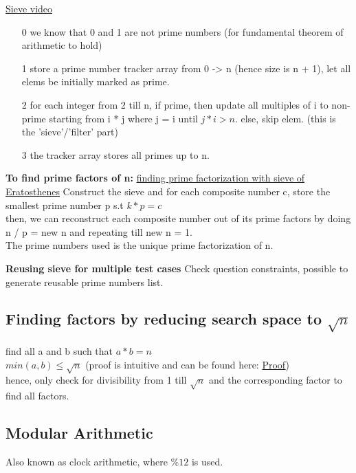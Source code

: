 \documentclass[12pt]{article}
\begin{document}
\href{https://www.khanacademy.org/computing/computer-science/cryptography/comp-number-theory/v/sieve-of-eratosthenes-prime-adventure-part-4}{Sieve video}
\begin{itemize} 
	\item[0] we know that 0 and 1 are not prime numbers (for fundamental theorem of arithmetic to hold) 
	\item[1] store a prime number tracker array from 0 -> n (hence size is n + 1), let all elems be initially marked as prime.  
	\item[2] for each integer from 2 till n, if prime, then update all multiples of i to non-prime starting from i * j where j = i until {\emph{\(j * i > n\)}}. else, skip elem. (this is the 'sieve'/'filter' part) 
	\item[3] the tracker array stores all primes up to n. 
\end{itemize} 

{\textbf{To find prime factors of n:}}
\href{https://www.geeksforgeeks.org/prime-factorization-using-sieve-olog-n-multiple-queries/}{finding prime factorization with sieve of Eratosthenes} 
Construct the sieve and for each composite number c, store the smallest prime number p s.t \(k * p = c\) \\ 
then, we can reconstruct each composite number out of its prime factors by doing n / p = new n and repeating till new n = 1. \\ 
The prime numbers used is the unique prime factorization of n. 

{\textbf{Reusing sieve for multiple test cases}} 
Check question constraints, possible to generate reusable prime numbers list. 

\subsection{Finding factors by reducing search space to \(\sqrt{n}\)}
find all a and b such that \(a * b = n\) \\ 
\(min(a, b) \leq \sqrt{n}\) (proof is intuitive and can be found here: \href{https://www.codechef.com/LRNDSA05?order=desc&sortBy=successful_submissions}{Proof}) \\
hence, only check for divisibility from 1 till \(\sqrt{n}\) and the corresponding factor to find all factors. 

\subsection{Modular Arithmetic} 
Also known as clock arithmetic, where \( \% 12\) is used. 
\end{document}
